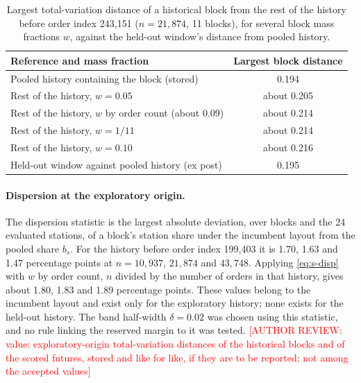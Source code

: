 \documentclass[11pt]{article}
\newcommand{\authorreview}[1]{\textcolor{red}{[AUTHOR REVIEW: #1]}}
\begin{document}
\begin{table}[htbp]
\centering
\caption{Largest total-variation distance of a historical block from the rest of the history before order index 243,151 ($n=21{,}874$, 11 blocks), for several block mass fractions $w$, against the held-out window's distance from pooled history.}
\label{tab:s-w}
\small
\begin{tabular}{@{}lc@{}}
\toprule
Reference and mass fraction & Largest block distance \\
\midrule
Pooled history containing the block (stored) & 0.194 \\
Rest of the history, $w=0.05$ & about 0.205 \\
Rest of the history, $w$ by order count (about 0.09) & about 0.214 \\
Rest of the history, $w=1/11$ & about 0.214 \\
Rest of the history, $w=0.10$ & about 0.216 \\
\midrule
Held-out window against pooled history (ex post) & 0.195 \\
\bottomrule
\end{tabular}
\end{table}

\paragraph{Dispersion at the exploratory origin.} The dispersion statistic is the largest absolute deviation, over blocks and the 24 evaluated stations, of a block's station share under the incumbent layout from the pooled share $b_s$. For the history before order index 199,403 it is 1.70, 1.63 and 1.47 percentage points at $n=10{,}937$, $21{,}874$ and $43{,}748$. Applying \eqref{eq:s-disp} with $w$ by order count, $n$ divided by the number of orders in that history, gives about 1.80, 1.83 and 1.89 percentage points. These values belong to the incumbent layout and exist only for the exploratory history; none exists for the held-out history. The band half-width $\delta=0.02$ was chosen using this statistic, and no rule linking the reserved margin to it was tested. \authorreview{value: exploratory-origin total-variation distances of the historical blocks and of the scored futures, stored and like for like, if they are to be reported; not among the accepted values}



\end{document}
